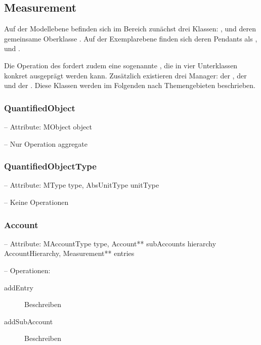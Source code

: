 \subsection{Measurement}


Auf der Modellebene befinden sich im Bereich  zunächst drei Klassen: , 
und deren gemeinsame Oberklasse . Auf der Exemplarebene finden sich deren Pendants als ,
 und .

Die Operation  des  fordert zudem eine sogenannte ,
die in vier Unterklassen konkret ausgeprägt werden kann.
Zusätzlich existieren drei Manager: der , der  und der .
Diese Klassen werden im Folgenden nach Themengebieten beschrieben.


\subsubsection{QuantifiedObject}


-- Attribute: MObject object

-- Nur Operation aggregate


\subsubsection{QuantifiedObjectType}


-- Attribute: MType type, AbsUnitType unitType

-- Keine Operationen


\subsubsection{Account}


-- Attribute: MAccountType type, Account** subAccounts hierarchy AccountHierarchy, Measurement** entries

-- Operationen:

\begin{description}
	\item[addEntry] Beschreiben
	\item[addSubAccount] Beschreiben
\end{description}

